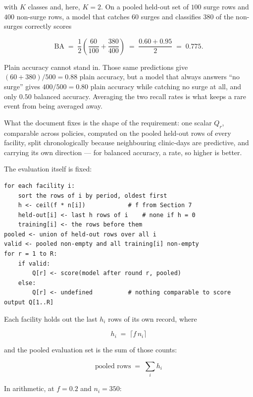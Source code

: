 \noindent
with $K$ classes and, here, $K = 2$. On a pooled held-out set of $100$ surge rows and $400$
non-surge rows, a model that catches $60$ surges and classifies $380$ of the non-surges correctly
scores

\[
\mathrm{BA} \;=\; \frac{1}{2}\left(\frac{60}{100} + \frac{380}{400}\right)
\;=\; \frac{0.60 + 0.95}{2} \;=\; 0.775 .
\]

\noindent
Plain accuracy cannot stand in. Those same predictions give $(60 + 380)/500 = 0.88$ plain accuracy,
but a model that always answers ``no surge'' gives $400/500 = 0.80$ plain accuracy while catching no
surge at all, and only $0.50$ balanced accuracy. Averaging the two recall rates is what keeps a rare
event from being averaged away.

What the document fixes is the shape of the
requirement: one scalar $Q_r$, comparable across policies, computed on the pooled held-out rows
of every facility, split chronologically because neighbouring clinic-days are predictive, and
carrying its own direction --- for balanced accuracy, a rate, so higher is better.

\noindent
The evaluation itself is fixed:

{\small
\begin{verbatim}
for each facility i:
    sort the rows of i by period, oldest first
    h <- ceil(f * n[i])            # f from Section 7
    held-out[i] <- last h rows of i    # none if h = 0
    training[i] <- the rows before them
pooled <- union of held-out rows over all i
valid <- pooled non-empty and all training[i] non-empty
for r = 1 to R:
    if valid:
        Q[r] <- score(model after round r, pooled)
    else:
        Q[r] <- undefined          # nothing comparable to score
output Q[1..R]
\end{verbatim}
}

\noindent
Each facility holds out the last $h_i$ rows of its own record, where

\begin{equation}
h_i \;=\; \lceil f\, n_i \rceil
\label{eq:holdout}
\end{equation}

\noindent
and the pooled evaluation set is the sum of those counts:

\begin{equation}
\text{pooled rows} \;=\; \sum_i h_i
\label{eq:pooled}
\end{equation}

\noindent
In arithmetic, at $f = 0.2$ and $n_i = 350$:

